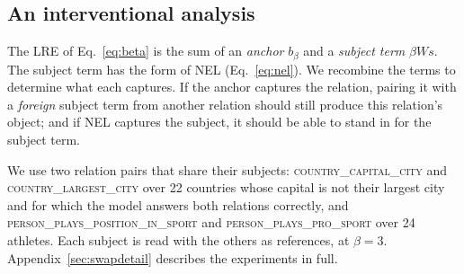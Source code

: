 \subsection{An interventional analysis}
\label{sec:swap}

The LRE of Eq.~\ref{eq:beta} is the sum of an \emph{anchor}
$b_\beta$
and a \emph{subject term}
$\beta W s$. The subject term has the form of NEL
(Eq.~\ref{eq:nel}).
We recombine the terms to determine what each captures. If the anchor captures the relation, pairing it with a
\emph{foreign} subject term from another relation should still
produce this relation's object;
and if NEL  captures the subject, it
should be able to stand in for the subject term.


We use two relation pairs that share their subjects:
\textsc{country\_capital\_city} and \textsc{country\_largest\_city} over
22 countries whose capital is not their largest city and for which the
model answers both relations correctly, and
\textsc{person\_plays\_position\_in\_sport} and
\textsc{person\_plays\_pro\_sport} over 24 athletes. Each subject is read
with the others as references, at $\beta = 3$.
Appendix~\ref{sec:swapdetail} describes the experiments in full.

